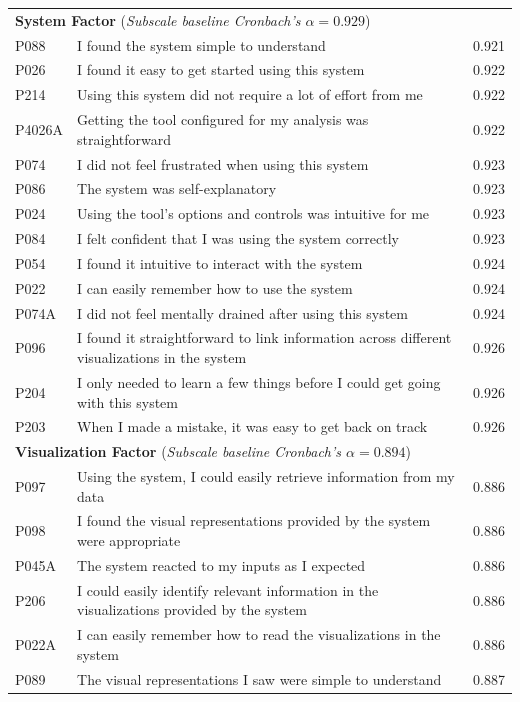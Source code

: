 \begin{table}[ht]
\begin{tabular}{llr}
\multicolumn{3}{l}{\textbf{System Factor} (\textit{Subscale baseline Cronbach's $\alpha = 0.929$})} \\
P088 & I found the system simple to understand & 0.921 \\
P026 & I found it easy to get started using this system & 0.922 \\
P214 & Using this system did not require a lot of effort from me & 0.922 \\
P4026A & Getting the tool configured for my analysis was straightforward & 0.922 \\
P074 & I did not feel frustrated when using this system & 0.923 \\
P086 & The system was self-explanatory & 0.923 \\
P024 & Using the tool's options and controls was intuitive for me & 0.923 \\
P084 & I felt confident that I was using the system correctly & 0.923 \\
P054 & I found it intuitive to interact with the system & 0.924 \\
P022 & I can easily remember how to use the system & 0.924 \\
P074A & I did not feel mentally drained after using this system & 0.924 \\
P096 & I found it straightforward to link information across different visualizations in the system & 0.926 \\
P204 & I only needed to learn a few things before I could get going with this system & 0.926 \\
P203 & When I made a mistake, it was easy to get back on track & 0.926 \\ \hline
\multicolumn{3}{l}{\textbf{Visualization Factor} (\textit{Subscale baseline Cronbach's $\alpha = 0.894$})} \\
P097 & Using the system, I could easily retrieve information from my data & 0.886 \\
P098 & I found the visual representations provided by the system were appropriate & 0.886 \\
P045A & The system reacted to my inputs as I expected & 0.886 \\
P206 & I could easily identify relevant information in the visualizations provided by the system & 0.886 \\
P022A & I can easily remember how to read the visualizations in the system & 0.886 \\
P089 & The visual representations I saw were simple to understand & 0.887 \\

\end{tabular}
\end{table}
